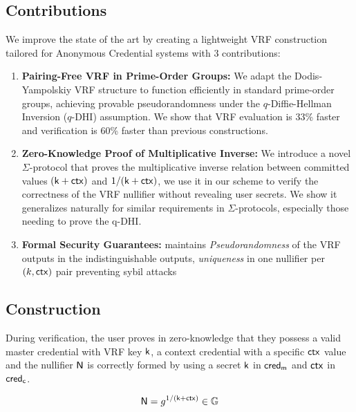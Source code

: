 \subsection{Contributions}

\noindent We improve the state of the art by creating a lightweight VRF construction tailored for Anonymous Credential systems with 3 contributions:
\begin{enumerate}
        \item \textbf{Pairing-Free VRF in Prime-Order Groups:} We adapt the Dodis-Yampolskiy VRF structure to function efficiently in standard prime-order groups, achieving provable pseudorandomness under the $q$-Diffie-Hellman Inversion ($q$-DHI) assumption. We show that VRF evaluation is 33\% faster and verification is 60\% faster than previous constructions.

        \item \textbf{Zero-Knowledge Proof of Multiplicative Inverse:} We introduce a novel $\Sigma$-protocol that proves the multiplicative inverse relation between committed values $(\mathsf{k} + \mathsf{ctx})$ and $1/(\mathsf{k} + \mathsf{ctx})$, we use it in our scheme to verify the correctness of the VRF nullifier without revealing user secrets. We show it generalizes naturally for similar requirements in $\Sigma$-protocols, especially those needing to prove the q-DHI.

         \item \textbf{Formal Security Guarantees:} maintains \emph{Pseudorandomness} of the VRF outputs in the indistinguishable outputs, \emph{uniqueness} in one nullifier per $(k, \mathsf{ctx})$ pair preventing sybil attacks

\end{enumerate}











\subsection{Construction}
During verification, the user proves in zero-knowledge that they possess a valid master credential with VRF key $\mathsf{k}$, a context credential with a specific $\mathsf{ctx}$ value and the nullifier $\mathsf{N}$ is correctly formed by using a secret $\mathsf{k}$ in $\mathsf{cred_m}$ and $\mathsf{ctx}$ in $\mathsf{cred_c}$. 

\begin{equation}
\mathsf{N} = g^{1/(\mathsf{k} + \mathsf{ctx})} \in \mathbb{G}
\end{equation}


